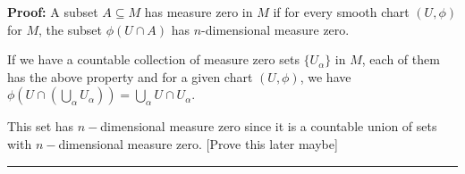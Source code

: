 \documentclass{article}
\begin{document}
\textbf{Proof:}
A subset $A \subseteq M$ has measure zero in $M$ if for every smooth chart $(U, \phi)$ for $M$, the subset $\phi(U \cap A)$ has $n$-dimensional measure zero.

\vskip 0.25cm
If we have a countable collection of measure zero sets $\{U_{\alpha}\}$ in $M$, each of them has the above property and for a given chart $(U, \phi)$, we have $\phi \left( U \cap \left(\bigcup_{\alpha} U_{\alpha}\right) \right) = \bigcup_{\alpha} U \cap U_{\alpha}$.

\vskip 0.25cm
This set has $n-$dimensional measure zero since it is a countable union of sets with $n-$dimensional measure zero. [Prove this later maybe]


\vskip 0.5cm
\hrule
\vskip 0.5cm









\end{document}
